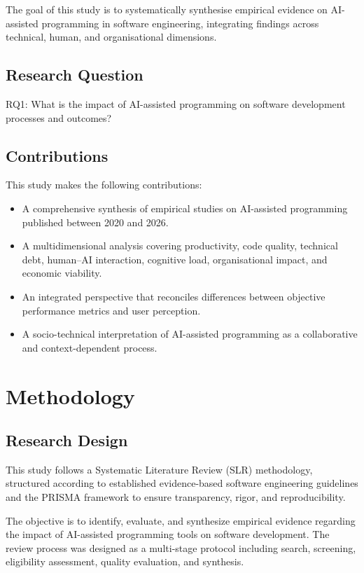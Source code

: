 \documentclass[conference]{IEEEtran}
\begin{document}
The goal of this study is to systematically synthesise empirical evidence on AI-assisted programming in software engineering, integrating findings across technical, human, and organisational dimensions.

\subsection{Research Question}

RQ1: What is the impact of AI-assisted programming on software development processes and outcomes?

\subsection{Contributions}

This study makes the following contributions:

\begin{itemize}
    \item A comprehensive synthesis of empirical studies on AI-assisted programming published between 2020 and 2026.
    \item A multidimensional analysis covering productivity, code quality, technical debt, human--AI interaction, cognitive load, organisational impact, and economic viability.
    \item An integrated perspective that reconciles differences between objective performance metrics and user perception.
    \item A socio-technical interpretation of AI-assisted programming as a collaborative and context-dependent process.
\end{itemize}

\section{Methodology}

\subsection{Research Design}

This study follows a Systematic Literature Review (SLR) methodology, structured according to established evidence-based software engineering guidelines \cite{kitchenham2007guidelines} and the PRISMA framework \cite{page2021prisma} to ensure transparency, rigor, and reproducibility.

The objective is to identify, evaluate, and synthesize empirical evidence regarding the impact of AI-assisted programming tools on software development. The review process was designed as a multi-stage protocol including search, screening, eligibility assessment, quality evaluation, and synthesis.
\end{document}
